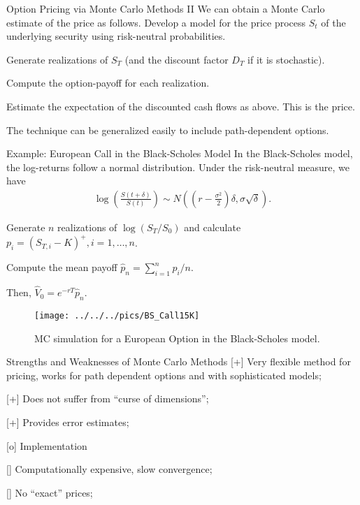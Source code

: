 Option Pricing via Monte Carlo Methods II
	We can obtain a Monte Carlo estimate of the price as follows.
		Develop a model for the price process $S_t$ of the underlying security
		using risk-neutral probabilities.
		
		Generate realizations of $S_T$ (and the discount factor $D_T$ if it is
		stochastic).
		
		Compute the option-payoff for each realization.
		
		Estimate the expectation of the discounted cash flows as above. This is
		the price.

	The technique can be generalized easily to include path-dependent options.


Example: European Call in the Black-Scholes Model
	In the Black-Scholes model, the log-returns follow a normal distribution. Under
	the risk-neutral measure, we have
		\begin{align*}
		\log\left(\frac{S(t+\delta)}{S(t)} \right) \sim
			N\left(\left( r-\frac{\sigma^2}{2}\right)\delta,\sigma \sqrt{\delta}\right).
		\end{align*}

  Generate $n$ realizations of $\log(S_{T}/S_0)$ and calculate
  $p_i=(S_{T,i}-K)^+, i=1,\ldots,n$.
   
	Compute the mean payoff $\hat{p}_n=\sum_{i=1}^n p_i/n$.
   
	Then, $\hat{V}_0 = e^{-rT}\hat{p}_n$.

	\begin{figure}[htp]
	\begin{center}
		\texttt{[image: ../../../pics/BS\_Call15K]}
		\caption{MC simulation for a European Option in the Black-Scholes model.}
	\end{center}
	\end{figure}


Strengths and Weaknesses of Monte Carlo Methods
	[+] Very flexible method for pricing, works for path dependent options
  and with sophisticated models;
  
	[+] Does not suffer from ``curse of dimensions'';
  
	[+] Provides error estimates;
  
	[o\hspace{1px}] Implementation
  
	[\textendash\hspace{1px}] Computationally expensive, slow convergence;
  
	[\textendash\hspace{1px}] No ``exact'' prices;
  
